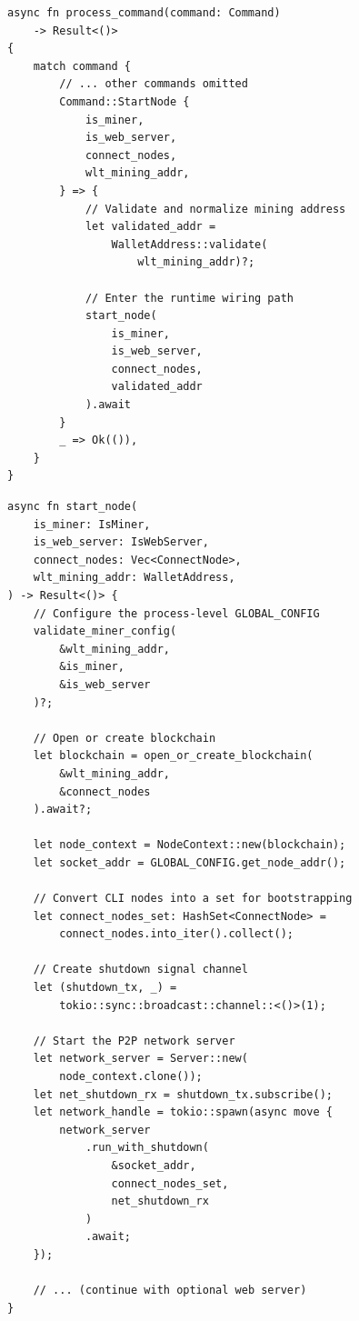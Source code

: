 \begin{listing}[htbp]
\caption{CLI dispatch ()}
\label{lst:9-9-2}
\begin{verbatim}
async fn process_command(command: Command)
    -> Result<()>
{
    match command {
        // ... other commands omitted
        Command::StartNode {
            is_miner,
            is_web_server,
            connect_nodes,
            wlt_mining_addr,
        } => {
            // Validate and normalize mining address
            let validated_addr =
                WalletAddress::validate(
                    wlt_mining_addr)?;

            // Enter the runtime wiring path
            start_node(
                is_miner,
                is_web_server,
                connect_nodes,
                validated_addr
            ).await
        }
        _ => Ok(()),
    }
}
\end{verbatim}
\end{listing}

\begin{listing}[htbp]
\caption{Wiring the node runtime ()}
\label{lst:9-9-3}
\begin{verbatim}
async fn start_node(
    is_miner: IsMiner,
    is_web_server: IsWebServer,
    connect_nodes: Vec<ConnectNode>,
    wlt_mining_addr: WalletAddress,
) -> Result<()> {
    // Configure the process-level GLOBAL_CONFIG
    validate_miner_config(
        &wlt_mining_addr,
        &is_miner,
        &is_web_server
    )?;

    // Open or create blockchain
    let blockchain = open_or_create_blockchain(
        &wlt_mining_addr,
        &connect_nodes
    ).await?;

    let node_context = NodeContext::new(blockchain);
    let socket_addr = GLOBAL_CONFIG.get_node_addr();

    // Convert CLI nodes into a set for bootstrapping
    let connect_nodes_set: HashSet<ConnectNode> =
        connect_nodes.into_iter().collect();

    // Create shutdown signal channel
    let (shutdown_tx, _) =
        tokio::sync::broadcast::channel::<()>(1);

    // Start the P2P network server
    let network_server = Server::new(
        node_context.clone());
    let net_shutdown_rx = shutdown_tx.subscribe();
    let network_handle = tokio::spawn(async move {
        network_server
            .run_with_shutdown(
                &socket_addr,
                connect_nodes_set,
                net_shutdown_rx
            )
            .await;
    });

    // ... (continue with optional web server)
}
\end{verbatim}
\end{listing}

